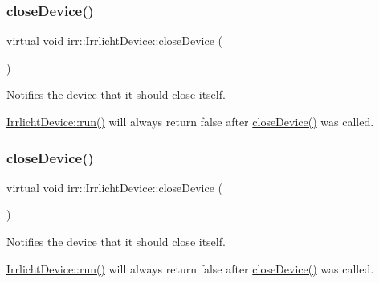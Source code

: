 \subsubsection{\texorpdfstring{close\+Device()}{closeDevice()}\hspace{0.1cm}{\footnotesize\ttfamily [1/2]}}
{\footnotesize\ttfamily virtual void irr\+::\+Irrlicht\+Device\+::close\+Device (\begin{DoxyParamCaption}{ }\end{DoxyParamCaption})\hspace{0.3cm}{\ttfamily [pure virtual]}}



Notifies the device that it should close itself. 

\hyperlink{classirr_1_1IrrlichtDevice_a0489f8151dc43f6f41503ffb5a160b35}{Irrlicht\+Device\+::run()} will always return false after \hyperlink{classirr_1_1IrrlichtDevice_a08c97937e0f60f98d443b397a7c60e18}{close\+Device()} was called. \mbox{\label{classirr_1_1IrrlichtDevice_a08c97937e0f60f98d443b397a7c60e18}} 
\subsubsection{\texorpdfstring{close\+Device()}{closeDevice()}\hspace{0.1cm}{\footnotesize\ttfamily [2/2]}}
{\footnotesize\ttfamily virtual void irr\+::\+Irrlicht\+Device\+::close\+Device (\begin{DoxyParamCaption}{ }\end{DoxyParamCaption})\hspace{0.3cm}{\ttfamily [pure virtual]}}



Notifies the device that it should close itself. 

\hyperlink{classirr_1_1IrrlichtDevice_a0489f8151dc43f6f41503ffb5a160b35}{Irrlicht\+Device\+::run()} will always return false after \hyperlink{classirr_1_1IrrlichtDevice_a08c97937e0f60f98d443b397a7c60e18}{close\+Device()} was called. \mbox{\label{classirr_1_1IrrlichtDevice_a267b069ea2c5f5b008fd7afa5b931ee9}} 
